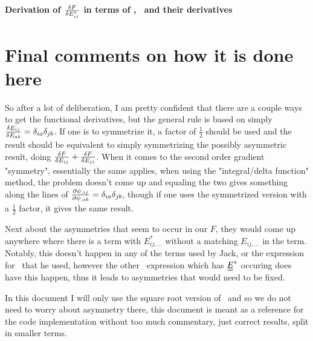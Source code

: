 \documentclass[11pt]{article}
\begin{document}
\begin{center}
    \LARGE
    \textbf{Derivation of $\fdv{F}{E_{ij}^*}$ in terms of \EE, \PP\ and their derivatives}
\end{center}
\vspace{1em}
\section{Final comments on how it is done here}
So after a lot of deliberation, I am pretty confident that there are a couple ways to get the functional derivatives, but the general rule is based on simply $\fdv{E_{ij}}{E_{ab}}=\delta_{ia}\delta_{jb}$.
If one is to symmetrize it, a factor of $\frac{1}{2}$ should be used and the result should be equivalent to simply symmetrizing the possibly asymmetric result, doing $\fdv{F}{E_{ij}} + \fdv{F}{E_{ji}}$.
When it comes to the second order gradient "symmetry", essentially the same applies, when using the "integral/delta function" method, the problem doesn't come up and equaling the two gives something along the lines of $\pdv{\psi_{,ij}}{\psi_{,ab}}=\delta_{ia}\delta_{jb}$, though if one uses the symmetrized version with a $\frac{1}{2}$ factor, it gives the same result.

Next about the asymmetries that seem to occur in our $F$, they would come up anywhere where there is a term with $E_{ij,\ldots}^*$ without a matching $E_{ij,\ldots}$ in the term.
Notably, this doesn't happen in any of the terms used by Jack, or the expression for \PP\ that he used, however the other \PP\ expression which has $\du{E}^*$ occuring does have this happen, thus it leads to asymmetries that would need to be fixed.

In this document I will only use the square root version of \PP\ and so we do not need to worry about asymmetry there, this document is meant as a reference for the code implementation without too much commentary, just correct results, split in smaller terms.

\newpage
\end{document}

